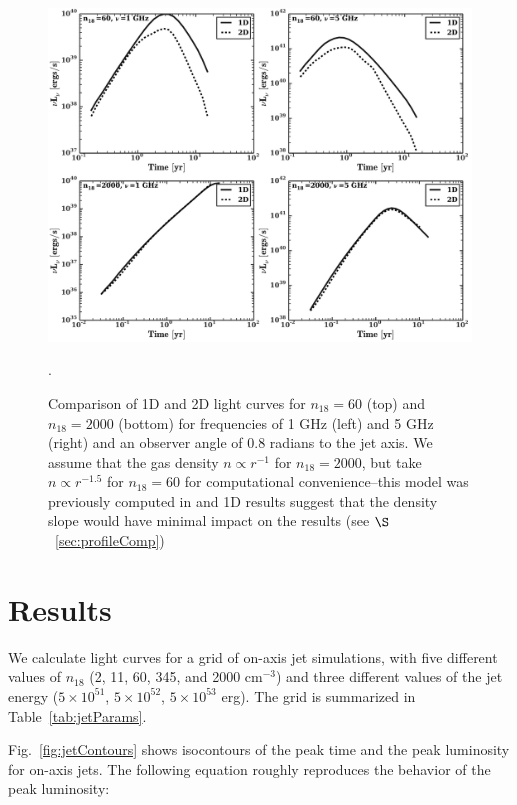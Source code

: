 \documentclass[usenatbib,fleqn]{mnras}
\begin{document}
\begin{figure}
\includegraphics[width=16cm]{1D_2D.pdf}
\caption{\label{fig:1D2DB} Comparison of 1D and 2D light curves for
  $n_{18}=60$ (top) and $n_{18}=2000$ (bottom) for frequencies of 1
  GHz (left) and 5 GHz (right) and an observer angle of 0.8 radians to
  the jet axis. We assume that the gas density $n\propto r^{-1}$ for
  $n_{18}=2000$, but take $n\propto r^{-1.5}$ for $n_{18}=60$ for
  computational convenience--this model was previously computed in
  \citet{Mimica+2015} and 1D results suggest that the density slope
  would have minimal impact on the results (see
  $\S$~\ref{sec:profileComp})}.
\end{figure}

\section{Results}
\label{sec:results}
We calculate light curves for a grid of on-axis jet simulations, with
five different values of $n_{18}$ (2, 11, 60, 345, and 2000 cm$^{-3}$)
and three different values of the jet energy ($5\times 10^{51}$,
$5\times 10^{52}$, $5\times 10^{53}$ erg). The grid is summarized in
Table~\ref{tab:jetParams}.


Fig.~\ref{fig:jetContours} shows isocontours of the peak time and the
peak luminosity for on-axis jets. The following equation roughly
reproduces the behavior of the peak luminosity:
\end{document}
